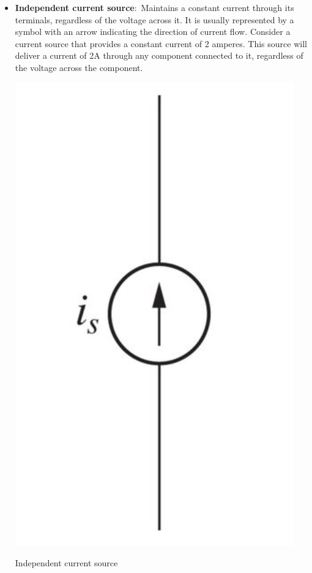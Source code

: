 \documentclass[nobib]{tufte-handout}
\newcommand{\defn}[2]{\noindent\textbf{#1}:\ #2}
\begin{document}
\begin{itemize}
    \item \defn{Independent current source}{Maintains a constant 
    current through its terminals, regardless of the 
    voltage across it. It is usually represented by 
    a symbol with an arrow indicating the 
    direction of current flow.} Consider a current source that 
    provides a constant current of 2 amperes. This source 
    will deliver a current of 2A through any component 
    connected to it, regardless of the 
    voltage across the component.
    \begin{marginfigure}
        \centering
        \includegraphics[width=\textwidth/2]{images/independentcurrentsource.png}
        \caption{Independent current source}
        \label{fig:independentcurrentsource}
    \end{marginfigure} 
    
\end{itemize}
\end{document}
